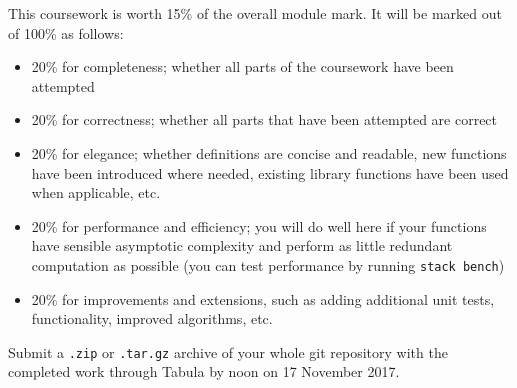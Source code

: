 \documentclass{../cs256-shared/cs256}
\begin{document}
This coursework is worth 15\% of the overall module mark. It will be marked out of 100\% as follows:
\begin{itemize}
\item 20\% for completeness; whether all parts of the coursework have been attempted
\item 20\% for correctness; whether all parts that have been attempted are correct
\item 20\% for elegance; whether definitions are concise and readable, new functions have been introduced where needed, existing library functions have been used when applicable, etc. 
\item 20\% for performance and efficiency; you will do well here if your functions have sensible asymptotic complexity and perform as little redundant computation as possible (you can test performance by running \texttt{stack bench})
\item 20\% for improvements and extensions, such as adding additional unit tests, functionality, improved algorithms, etc.
\end{itemize}
Submit a \texttt{.zip} or \texttt{.tar.gz} archive of your whole git repository with the completed work through Tabula by noon on 17 November 2017.
\end{document}
